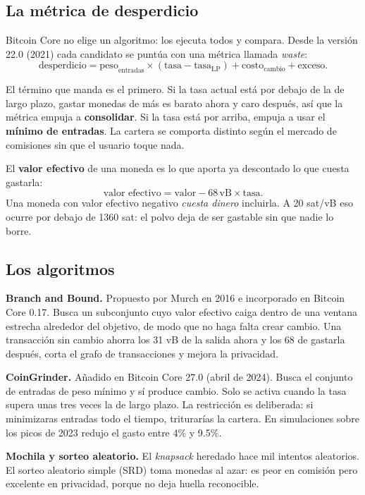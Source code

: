 \documentclass[11pt,a4paper]{article}
\theoremstyle{definition}
\theoremstyle{plain}
\theoremstyle{remark}
\begin{document}
\subsection{La métrica de desperdicio}

Bitcoin Core no elige un algoritmo: los ejecuta todos y compara. Desde la versión
22.0 (2021) cada candidato se puntúa con una métrica llamada \emph{waste}:
\[
  \text{desperdicio} = \text{peso}_{\text{entradas}} \times
  (\text{tasa} - \text{tasa}_{\text{LP}}) + \text{costo}_{\text{cambio}} + \text{exceso}.
\]

El término que manda es el primero. Si la tasa actual está por debajo de la de
largo plazo, gastar monedas de más es barato ahora y caro después, así que la
métrica empuja a \textbf{consolidar}. Si la tasa está por arriba, empuja a usar
el \textbf{mínimo de entradas}. La cartera se comporta distinto según el mercado
de comisiones sin que el usuario toque nada.

El \textbf{valor efectivo} de una moneda es lo que aporta ya descontado lo que
cuesta gastarla:
\[
  \text{valor efectivo} = \text{valor} - 68\,\text{vB} \times \text{tasa}.
\]
Una moneda con valor efectivo negativo \emph{cuesta dinero} incluirla. A
20 sat/vB eso ocurre por debajo de 1360 sat: el polvo deja de ser gastable sin
que nadie lo borre.

\subsection{Los algoritmos}

\textbf{Branch and Bound.} Propuesto por Murch en 2016 e incorporado en Bitcoin
Core 0.17. Busca un subconjunto cuyo valor efectivo caiga dentro de una ventana
estrecha alrededor del objetivo, de modo que no haga falta crear cambio. Una
transacción sin cambio ahorra los 31 vB de la salida ahora y los 68 de gastarla
después, corta el grafo de transacciones y mejora la privacidad.

\textbf{CoinGrinder.} Añadido en Bitcoin Core 27.0 (abril de 2024). Busca el
conjunto de entradas de peso mínimo y sí produce cambio. Solo se activa cuando la
tasa supera unas tres veces la de largo plazo. La restricción es deliberada: si
minimizaras entradas todo el tiempo, triturarías la cartera. En simulaciones
sobre los picos de 2023 redujo el gasto entre 4\% y 9.5\%.

\textbf{Mochila y sorteo aleatorio.} El \emph{knapsack} heredado hace mil
intentos aleatorios. El sorteo aleatorio simple (SRD) toma monedas al azar: es
peor en comisión pero excelente en privacidad, porque no deja huella reconocible.
\end{document}

